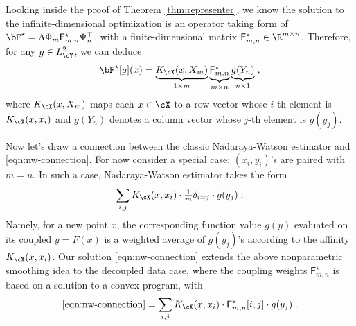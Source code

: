 \documentclass[11pt]{article}
\begin{document}
\begin{remark}
	\rm
	Looking inside the proof of Theorem \ref{thm:representer}, we know the solution to the infinite-dimensional optimization is an operator taking form of $\bF^\star = \Lambda \Phi_m \mathsf{F}_{m,n}^\star \Psi_n^\top$, with a finite-dimensional matrix $\mathsf{F}_{m,n}^\star\in \R^{m \times n}$. Therefore, for any $g \in L^2_\cY$, we can deduce
	\begin{align}
		\label{eqn:nw-connection}
		\bF^\star[g](x) =  \underbrace{K_\cX(x, X_m)}_{1\times m} \underbrace{\mathsf{F}_{m,n}^\star}_{m\times n} \underbrace{g(Y_n)}_{n\times 1} \;,
	\end{align}
	where $K_{\cX}(x, X_m)$ maps each $x \in \cX$ to a row vector whose $i$-th element is $K_{\cX}(x, x_i)$ and $g(Y_n)$ denotes a column vector whose $j$-th element is $g(y_j)$. 
	
	Now let's draw a connection between the classic Nadaraya-Watson estimator and \eqref{eqn:nw-connection}. For now consider a special case: $(x_i, y_i)$'s are paired with $m = n$. In such a case, Nadaraya-Watson estimator takes the form
	\begin{align}
		\sum_{i,j} K_{\cX}(x, x_i) \cdot \tfrac{1}{m} \delta_{i=j} \cdot g(y_j) \; ;
	\end{align}
	Namely, for a new point $x$, the corresponding function value $g(y)$ evaluated on its coupled $y = F(x)$ is a weighted average of $g(y_j)$'s according to the affinity $K_{\cX}(x, x_i)$. Our solution \eqref{eqn:nw-connection} extends the above nonparametric smoothing idea to the decoupled data case, where the coupling weights $\mathsf{F}_{m,n}^\star$ is based on a solution to a convex program, with
	\begin{align}
		\eqref{eqn:nw-connection} = \sum_{i,j} K_{\cX}(x, x_i) \cdot \mathsf{F}_{m,n}^\star[i,j] \cdot g(y_j) \;.
	\end{align}
	

\end{remark}
\end{document}
